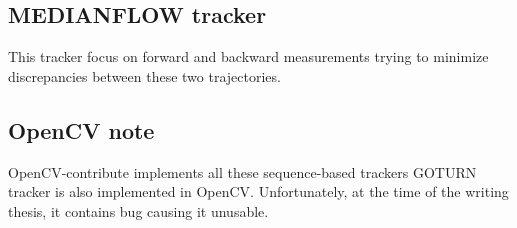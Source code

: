 \subsection*{MEDIANFLOW tracker}
This tracker focus on forward and backward measurements trying to minimize
discrepancies between these two trajectories.

\subsection*{OpenCV note}
OpenCV-contribute implements all these sequence-based trackers GOTURN tracker
is also implemented in OpenCV. Unfortunately, at the time of the writing
thesis, it contains bug causing it unusable.


%
%
%
%
%
%
